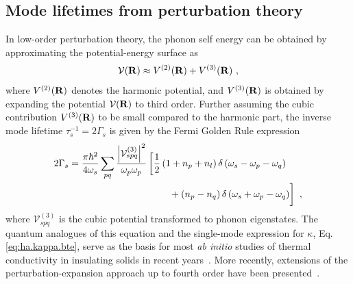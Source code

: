 \subsection{Mode lifetimes from perturbation theory}
In low-order perturbation theory, the phonon self energy can be obtained by approximating the potential-energy surface as
\begin{align}
	\mathcal{V} (\b R) \approx V^{(2)} (\b R) + V^{(3)} (\b R)~,
	\label{eq:V3}
\end{align}
where $V^{(2)} ({\bf R})$ denotes the harmonic potential, and $V^{(3)} ({\bf R})$ is obtained by expanding the potential $\mathcal V ({\bf R})$ to third order. Further assuming the cubic contribution $V^{(3)} ({\bf R})$ to be small compared to the harmonic part, the inverse mode lifetime $\tau_s^{-1} = 2 \Gamma_s$ is given by the Fermi Golden Rule expression~\cite{Fabian1996}
\begin{align}
\begin{split}
	2 \Gamma_{s}=\frac{\pi \hbar^{2}}{4 \omega_{s}} \sum_{pq} \frac{\left|\mathcal V^{(3)}_{spq}\right|^{2}}{\omega_{p} \omega_{p}}
		&\left[ 
	  \frac{1}{2}\left(1+n_{p}+n_{l}\right) \delta\left(\omega_{s}-\omega_{p}-\omega_{q}\right) \right. \\
		&\left.~~~~ \phantom{\halb} + \left(n_{p}-n_{q}\right) \delta\left(\omega_{s}+\omega_{p}-\omega_{q}\right)\right]~,
\end{split}
\end{align}
where $\mathcal V^{(3)}_{spq}$ is the cubic potential transformed to phonon eigenstates. The quantum analogues of this equation and the single-mode expression for $\kappa$, Eq.\,\eqref{eq:ha.kappa.bte}, serve as the basis for most \emph{ab initio} studies of thermal conductivity in insulating solids in recent years~\cite{Broido2007,Simoncelli2019,Isaeva2019}. More recently, extensions of the perturbation-expansion approach up to fourth order have been presented~\cite{Feng2016,Feng2017,Ravichandran2018,Xia2018}.

